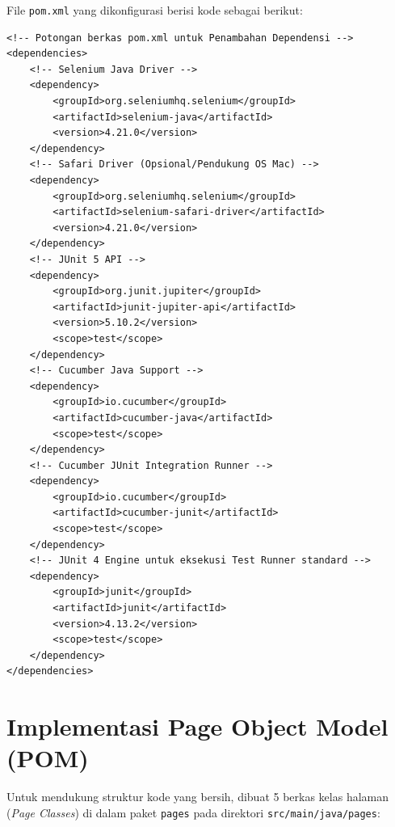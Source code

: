 \documentclass[a4paper,oneside,12pt]{report}
\begin{document}
File \texttt{pom.xml} yang dikonfigurasi berisi kode sebagai berikut:
\begin{lstlisting}[style=xmlstyle, caption={Konfigurasi Dependensi Cucumber dan Selenium di pom.xml}]
<!-- Potongan berkas pom.xml untuk Penambahan Dependensi -->
<dependencies>
    <!-- Selenium Java Driver -->
    <dependency>
        <groupId>org.seleniumhq.selenium</groupId>
        <artifactId>selenium-java</artifactId>
        <version>4.21.0</version>
    </dependency>
    <!-- Safari Driver (Opsional/Pendukung OS Mac) -->
    <dependency>
        <groupId>org.seleniumhq.selenium</groupId>
        <artifactId>selenium-safari-driver</artifactId>
        <version>4.21.0</version>
    </dependency>
    <!-- JUnit 5 API -->
    <dependency>
        <groupId>org.junit.jupiter</groupId>
        <artifactId>junit-jupiter-api</artifactId>
        <version>5.10.2</version>
        <scope>test</scope>
    </dependency>
    <!-- Cucumber Java Support -->
    <dependency>
        <groupId>io.cucumber</groupId>
        <artifactId>cucumber-java</artifactId>
        <scope>test</scope>
    </dependency>
    <!-- Cucumber JUnit Integration Runner -->
    <dependency>
        <groupId>io.cucumber</groupId>
        <artifactId>cucumber-junit</artifactId>
        <scope>test</scope>
    </dependency>
    <!-- JUnit 4 Engine untuk eksekusi Test Runner standard -->
    <dependency>
        <groupId>junit</groupId>
        <artifactId>junit</artifactId>
        <version>4.13.2</version>
        <scope>test</scope>
    </dependency>
</dependencies>
\end{lstlisting}

\section{Implementasi Page Object Model (POM)}
Untuk mendukung struktur kode yang bersih, dibuat 5 berkas kelas halaman (\textit{Page Classes}) di dalam paket \texttt{pages} pada direktori \texttt{src/main/java/pages}:
\end{document}
